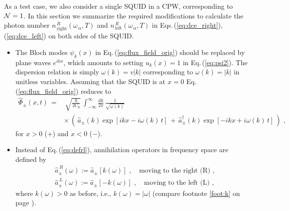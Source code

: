 \noindent
As a test case, we also consider a single SQUID in a CPW, 
corresponding to ${\cal N}=1$. 
In this section we summarize the required modifications to calculate the photon number 
$n_{\,\text{right}}^{\,R}(\omega_{\,\alpha}, T)$ and 
$n_{\,\text{left}}^{\,R}(\omega_{\,\alpha}, T)$ 
in Eqs.\,(\ref{eq:dce_right}), (\ref{eq:dce_left}) on both sides of the SQUID. 

\begin{itemize}

\item The Bloch modes $\psi_k(x)$ in Eq.\,(\ref{eq:flux_field_orig}) should be 
replaced by plane waves $e^{i k x}$, which amounts to setting $u_k(x)=1$ in Eq.\,(\ref{eq:psi2}). 
The dispersion relation is simply $\omega(k) = v |k|$ corresponding to $\omega(k) = |k|$
in unitless variables. Assuming that the SQUID is at $x=0$
Eq.\,(\ref{eq:flux_field_orig}) reduces to
%
\begin{equation} \label{eq:flux_field_single}
\begin{split}
    \hat{\Phi}_{\pm}(x,t) \, = & \, \sqrt{\frac{\hbar}{2 C_0}} \, 
    \int_{-\infty}^{\infty}\frac{dk}{2 \pi} \,
    \frac{1}{\sqrt{\omega(k)}} \\[3mm]
    & \times \, \left( \, \hat{a}_{\pm}(k) \exp\left[i k x - i \omega(k) \, t \right] \, + \, 
    \hat{a}_{\pm}^{\dagger}(k) \exp\left[- i k x + i \omega(k) \, t \right] \, \right) \, \, ,
\end{split}
\end{equation}
%
for $x>0$ ($+$) and $x<0$ ($-$). 

\item
Instead of Eq.\,(\ref{eq:defrl}), annihilation operators in frequency space 
are defined by
%
\begin{subequations} \label{eq:defrl_single}
\begin{eqnarray}
& \hat{a}_{\pm}^{\,R}(\omega) := \hat{a}_{\pm} \left[k(\omega) \right] \, \, , 
 \quad \text{moving to the right (R)} \, \, , \\[2mm]
& \hat{a}_{\pm}^{\,L}(\omega) := \hat{a}_{\pm} \left[ - k(\omega) \right] \, \, , 
 \quad \text{moving to the left (L)} \, \, ,
\end{eqnarray}
\end{subequations}
%
where $k(\omega) > 0$ as before, i.e., $k(\omega) = |\omega|$ (compare footnote \ref{foot:k} 
on page \pageref{foot:k}). 


\end{itemize}
